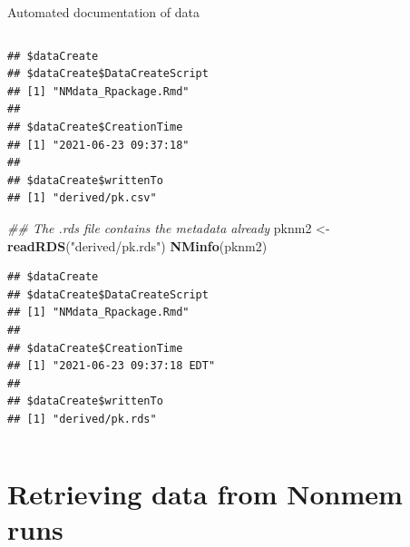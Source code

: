 \documentclass[
  8pt,
  ignorenonframetext,
  aspectratio=169]{beamer}
\newenvironment{Shaded}{\begin{snugshade}}{\end{snugshade}}
\newcommand{\CommentTok}[1]{\textcolor[rgb]{0.56,0.35,0.01}{\textit{#1}}}
\newcommand{\KeywordTok}[1]{\textcolor[rgb]{0.13,0.29,0.53}{\textbf{#1}}}
\newcommand{\NormalTok}[1]{#1}
\newcommand{\StringTok}[1]{\textcolor[rgb]{0.31,0.60,0.02}{#1}}
\begin{document}
\begin{frame}[fragile]{Automated documentation of data}
\begin{columns}[T]
\begin{column}{0.48\textwidth}
\begin{verbatim}
## $dataCreate
## $dataCreate$DataCreateScript
## [1] "NMdata_Rpackage.Rmd"
## 
## $dataCreate$CreationTime
## [1] "2021-06-23 09:37:18"
## 
## $dataCreate$writtenTo
## [1] "derived/pk.csv"
\end{verbatim}

\begin{Shaded}
\begin{Highlighting}[]
\CommentTok{\#\# The .rds file contains the metadata already}
\NormalTok{pknm2 \textless{}{-}}\StringTok{ }\KeywordTok{readRDS}\NormalTok{(}\StringTok{"derived/pk.rds"}\NormalTok{)}
\KeywordTok{NMinfo}\NormalTok{(pknm2)}
\end{Highlighting}
\end{Shaded}

\begin{verbatim}
## $dataCreate
## $dataCreate$DataCreateScript
## [1] "NMdata_Rpackage.Rmd"
## 
## $dataCreate$CreationTime
## [1] "2021-06-23 09:37:18 EDT"
## 
## $dataCreate$writtenTo
## [1] "derived/pk.rds"
\end{verbatim}
\end{column}
\end{columns}

\normalsize
\end{frame}

\hypertarget{retrieving-data-from-nonmem-runs}{%
\section{Retrieving data from Nonmem
runs}\label{retrieving-data-from-nonmem-runs}}
\end{document}

